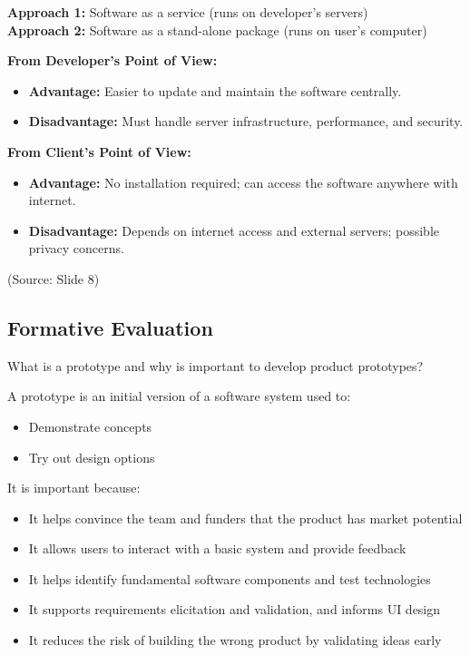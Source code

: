 \documentclass[12pt]{article}
\begin{document}
\textbf{Approach 1:} Software as a service (runs on developer's servers)\\
\textbf{Approach 2:} Software as a stand-alone package (runs on user's computer)

\textbf{From Developer's Point of View:}
\begin{itemize}
    \item \textbf{Advantage:} Easier to update and maintain the software centrally.
    \item \textbf{Disadvantage:} Must handle server infrastructure, performance, and security.
\end{itemize}

\textbf{From Client's Point of View:}
\begin{itemize}
    \item \textbf{Advantage:} No installation required; can access the software anywhere with internet.
    \item \textbf{Disadvantage:} Depends on internet access and external servers; possible privacy concerns.
\end{itemize}

(Source: Slide 8)

\subsection{Formative Evaluation}

\begin{questionbox}
What is a prototype and why is important to develop product prototypes?
\end{questionbox}

A prototype is an initial version of a software system used to:
\begin{itemize}
    \item Demonstrate concepts
    \item Try out design options
\end{itemize}

It is important because:
\begin{itemize}
    \item It helps convince the team and funders that the product has market potential
    \item It allows users to interact with a basic system and provide feedback
    \item It helps identify fundamental software components and test technologies
    \item It supports requirements elicitation and validation, and informs UI design
    \item It reduces the risk of building the wrong product by validating ideas early
\end{itemize}
\end{document}

